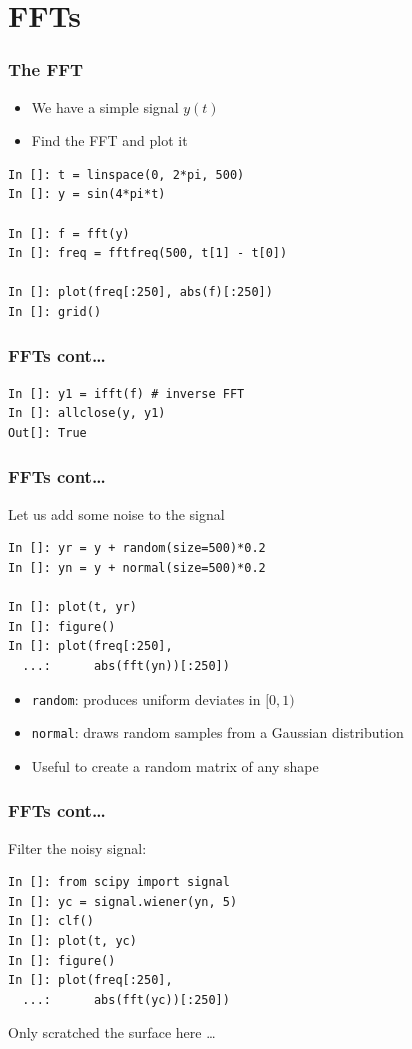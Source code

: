 \documentclass[14pt,compress]{beamer}
\newcounter{time}
\newcommand{\inctime}[1]{\addtocounter{time}{#1}{\tiny \thetime\ m}}
\newcommand{\typ}[1]{\lstinline{#1}}
\begin{document}
\section{FFTs}

\begin{frame}[fragile]
\frametitle{The FFT}
\begin{itemize}
    \item We have a simple signal $y(t)$
    \item Find the FFT and plot it
\end{itemize}
\begin{lstlisting}
In []: t = linspace(0, 2*pi, 500)
In []: y = sin(4*pi*t)

In []: f = fft(y)
In []: freq = fftfreq(500, t[1] - t[0])

In []: plot(freq[:250], abs(f)[:250])
In []: grid()
\end{lstlisting}
\end{frame}

\begin{frame}[fragile]
\frametitle{FFTs cont\dots}
\begin{lstlisting}
In []: y1 = ifft(f) # inverse FFT
In []: allclose(y, y1)
Out[]: True
\end{lstlisting}
\end{frame}

\begin{frame}[fragile]
\frametitle{FFTs cont\dots}
Let us add some noise to the signal
\begin{lstlisting}
In []: yr = y + random(size=500)*0.2
In []: yn = y + normal(size=500)*0.2

In []: plot(t, yr)
In []: figure()
In []: plot(freq[:250],
  ...:      abs(fft(yn))[:250])
\end{lstlisting}
\begin{itemize}
    \item \typ{random}: produces uniform deviates in $[0, 1)$
    \item \typ{normal}: draws random samples from a Gaussian
        distribution
    \item Useful to create a random matrix of any shape
\end{itemize}
\end{frame}

\begin{frame}[fragile]
\frametitle{FFTs cont\dots}
Filter the noisy signal:
\begin{lstlisting}
In []: from scipy import signal
In []: yc = signal.wiener(yn, 5)
In []: clf()
In []: plot(t, yc)
In []: figure()
In []: plot(freq[:250],
  ...:      abs(fft(yc))[:250])
\end{lstlisting}
Only scratched the surface here \dots
  \inctime{10}
\end{frame}
\end{document}

